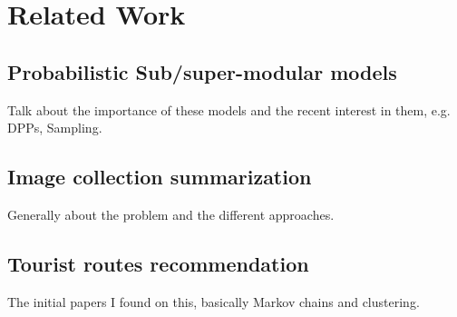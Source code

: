 \chapter{Related Work}
\label{sec:related_work}

\section{Probabilistic Sub/super-modular models}

Talk about the importance of these models and the recent interest in them, e.g. DPPs, Sampling.

\section{Image collection summarization}

Generally about the problem and the different approaches.

\section{Tourist routes recommendation}

The initial papers I found on this, basically Markov chains and clustering.